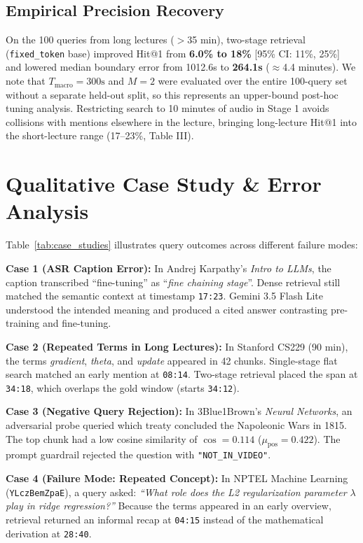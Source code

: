 \documentclass[conference]{IEEEtran}
\begin{document}
\subsection{Empirical Precision Recovery}
On the 100 queries from long lectures ($>$35 min), two-stage retrieval (\texttt{fixed\_token} base) improved Hit@1 from \textbf{6.0\% to 18\%} [95\% CI: 11\%, 25\%] and lowered median boundary error from 1012.6s to \textbf{264.1s} ($\approx$4.4 minutes). We note that $T_{\text{macro}}=300\text{s}$ and $M=2$ were evaluated over the entire 100-query set without a separate held-out split, so this represents an upper-bound post-hoc tuning analysis. Restricting search to 10 minutes of audio in Stage 1 avoids collisions with mentions elsewhere in the lecture, bringing long-lecture Hit@1 into the short-lecture range (17--23\%, Table III).

\section{Qualitative Case Study \& Error Analysis}
\label{sec:qualitative_analysis}
Table~\ref{tab:case_studies} illustrates query outcomes across different failure modes:

\textbf{Case 1 (ASR Caption Error):} In Andrej Karpathy's \textit{Intro to LLMs}, the caption transcribed ``fine-tuning'' as ``\textit{fine chaining stage}''. Dense retrieval still matched the semantic context at timestamp \texttt{17:23}. Gemini 3.5 Flash Lite understood the intended meaning and produced a cited answer contrasting pre-training and fine-tuning.

\textbf{Case 2 (Repeated Terms in Long Lectures):} In Stanford CS229 (90 min), the terms \textit{gradient}, \textit{theta}, and \textit{update} appeared in 42 chunks. Single-stage flat search matched an early mention at \texttt{08:14}. Two-stage retrieval placed the span at \texttt{34:18}, which overlaps the gold window (starts \texttt{34:12}).

\textbf{Case 3 (Negative Query Rejection):} In 3Blue1Brown's \textit{Neural Networks}, an adversarial probe queried which treaty concluded the Napoleonic Wars in 1815. The top chunk had a low cosine similarity of $\cos = 0.114$ ($\mu_{\text{pos}}=0.422$). The prompt guardrail rejected the question with \texttt{"NOT\_IN\_VIDEO"}.

\textbf{Case 4 (Failure Mode: Repeated Concept):} In NPTEL Machine Learning (\texttt{YLczBemZpaE}), a query asked: \textit{``What role does the L2 regularization parameter $\lambda$ play in ridge regression?''} Because the terms appeared in an early overview, retrieval returned an informal recap at \texttt{04:15} instead of the mathematical derivation at \texttt{28:40}.
\end{document}

